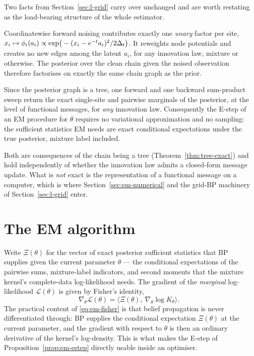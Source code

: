 Two facts from Section~\ref{sec:l-grid} carry over unchanged and are worth
restating as the load-bearing structure of the whole estimator.

\begin{proposition}
\label{prop:em-unary}
Coordinatewise forward noising contributes exactly one \emph{unary} factor per
site, $x_i \mapsto \phi_i(a_i) \propto \exp\!\big(-(x_i-e^{-t}a_i)^2/2\Delta_t\big)$.
It reweights node potentials and creates no new edges among the latent
$a_i$, for any innovation law, mixture or otherwise. The posterior over the
clean chain given the noised observation therefore factorises on exactly the
same chain graph as the prior.
\end{proposition}

\begin{proposition}\label{prop:em-estep}
Since the posterior graph is a tree, one forward and one backward
sum-product sweep return the exact single-site and pairwise marginals of the
posterior, at the level of functional messages, for \emph{any} innovation
law. Consequently the E-step of an EM procedure for $\theta$ requires no
variational approximation and no sampling: the sufficient statistics EM needs
are exact conditional expectations under the true posterior, mixture label
included.
\end{proposition}

Both are consequences of the chain being a tree (Theorem~\ref{thm:tree-exact})
and hold independently of whether the innovation law admits a closed-form
message update. What is \emph{not} exact is the representation of a functional
message on a computer, which is where Section~\ref{sec:em-numerical} and the
grid-BP machinery of Section~\ref{sec:l-grid} enter.

\section{The EM algorithm}\label{sec:em-algorithm}

Write $\Xi(\theta)$ for the vector of exact posterior sufficient statistics
that BP supplies given the current parameter $\theta$ --- the conditional
expectations of the pairwise sums, mixture-label indicators, and second
moments that the mixture kernel's complete-data log-likelihood needs. The
gradient of the \emph{marginal} log-likelihood $\mathcal L(\theta)$ is given
by Fisher's identity,
\begin{equation}
  \nabla_\theta \mathcal L(\theta)
  = \big\langle \Xi(\theta),\ \nabla_\theta \log K_\theta \big\rangle .
  \label{eq:em-fisher}
\end{equation}
The practical content of \eqref{eq:em-fisher} is that belief propagation is
never differentiated through: BP supplies the conditional expectation
$\Xi(\theta)$ at the current parameter, and the gradient with respect to
$\theta$ is then an ordinary derivative of the kernel's log-density. This
is what makes the E-step of Proposition~\ref{prop:em-estep} directly usable
inside an optimiser.

